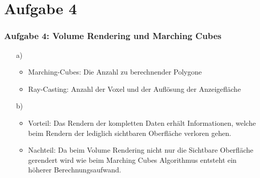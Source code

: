 \documentclass[accentcolor=tud9c,colorbacktitle,inverttitle,landscape,german,presentation,t]{tudbeamer}
\begin{document}
\section{Aufgabe 4}
\begin{frame}
	\frametitle{Aufgabe 4: Volume Rendering und Marching Cubes}
	\begin{itemize}
	\item[a)]
		\begin{itemize}
			\item Marching-Cubes: Die Anzahl zu berechnender Polygone \\
			\item Ray-Casting: Anzahl der Voxel und der Auflösung der Anzeigefläche
		\end{itemize}
	\item[b)] %
	\begin{itemize}
		\item Vorteil: Das Rendern der kompletten Daten erhält Informationen, welche beim Rendern der lediglich sichtbaren Oberfläche verloren gehen. \\
		\item Nachteil: Da beim Volume Rendering nicht nur die Sichtbare Oberfläche gerendert wird wie beim Marching Cubes Algorithmus entsteht ein höherer Berechnungsaufwand.
	\end{itemize}
	\end{itemize}
\end{frame}
\end{document}
